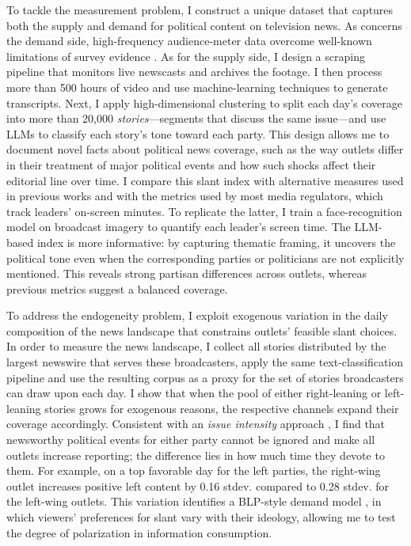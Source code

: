\documentclass[12pt]{article}
\begin{document}
To tackle the measurement problem, I construct a unique dataset that captures both the supply and demand for political content on television news. As concerns the demand side, high-frequency audience-meter data overcome well-known limitations of survey evidence \citep{prior}. As for the supply side, I design a scraping pipeline that monitors live newscasts and archives the footage. I then process more than 500 hours of video and use machine-learning techniques to generate transcripts. Next, I apply high-dimensional clustering to split each day’s coverage into more than 20,000 \emph{stories}—segments that discuss the same issue—and use LLMs to classify each story’s tone toward each party.  This design allows me to document novel facts about political news coverage, such as the way outlets differ in their treatment of major political events and how such shocks affect their editorial line over time. I compare this slant index with alternative measures used in previous works and with the metrics used by most media regulators, which track leaders’ on-screen minutes. To replicate the latter, I train a face-recognition model on broadcast imagery to quantify each leader’s screen time. The LLM-based index is more informative: by capturing thematic framing, it uncovers the political tone even when  the corresponding parties or politicians are not explicitly mentioned. This reveals strong partisan differences across outlets, whereas previous metrics suggest a balanced coverage.





To address the endogeneity problem, I exploit exogenous variation in the daily composition of the news landscape that  constrains outlets’ feasible slant choices. In order to measure the news landscape, I collect all stories distributed by the largest newswire that serves these broadcasters, apply the same text-classification pipeline and use the resulting corpus as  a proxy for the set of stories broadcasters can draw upon each day. I show that  when the pool of either right-leaning or left-leaning  stories grows for exogenous reasons, the respective channels expand  their coverage accordingly. Consistent with an \emph{issue intensity} approach \citep{puglisi_review}, I find that newsworthy political events for either party cannot be ignored and make all outlets increase reporting; the difference lies in how much time they devote to them. For example,  on a top favorable day for the left parties, the right-wing outlet increases positive left content by 0.16  stdev. compared to 0.28 stdev. for the left-wing outlets. This variation identifies a BLP-style demand model \citep{berry_blp}, in which viewers’ preferences for slant vary with their ideology, allowing me to test the degree of polarization in information consumption. 
\end{document}

